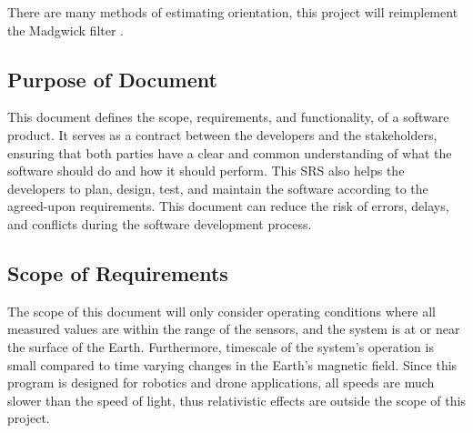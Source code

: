 \documentclass[12pt]{article}
\begin{document}
There are many methods of estimating orientation, this project will reimplement the Madgwick filter \cite{madgwick_ecient_nodate}.



\subsection{Purpose of Document}


This document defines the scope, requirements, and functionality, of a software product. It serves
as a contract between the developers and the stakeholders, ensuring that both parties have a clear
and common understanding of what the software should do and how it should perform. This SRS also
helps the developers to plan, design, test, and maintain the software according to the agreed-upon
requirements. This document can reduce the risk of errors, delays, and conflicts during the software
development process. \cite{purpose}

\subsection{Scope of Requirements}

The scope of this document will only consider operating conditions where all measured values are
within the range of the sensors, and the system is at or near the surface of the Earth. Furthermore,
timescale of the system's operation is small compared to time varying changes in the Earth's
magnetic field. Since this program is designed for robotics and drone applications, all speeds are
much slower than the speed of light, thus relativistic effects are outside the scope of this
project.
\end{document}
